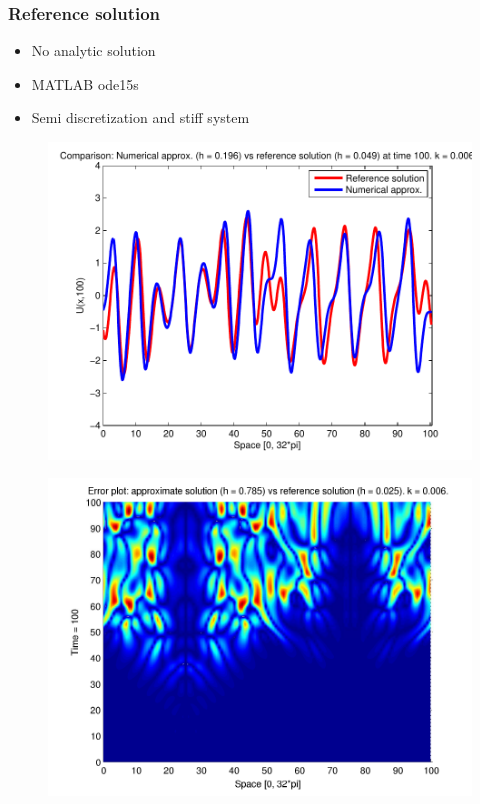 \documentclass[screen]{beamer}
\begin{document}
\begin{frame}
\frametitle{Reference solution}
\begin{itemize}
\item No analytic solution
\item MATLAB ode15s
\item Semi discretization and stiff system
\end{itemize}
\end{frame}


\begin{frame}

\begin{figure}[htb]
\includegraphics[width=1\textwidth]{comp_num_ref_t100.pdf}
\end{figure}

\end{frame}


\begin{frame}

\begin{figure}[htb]
\includegraphics[width=1\textwidth]{error_num_ref_t100_3rd.pdf}
\end{figure}

\end{frame}
\end{document}
